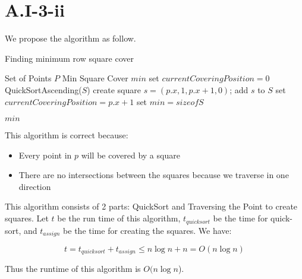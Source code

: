 \section*{A.I-3-ii}
\label{a-1-3-2}
We propose the algorithm as follow.

\begin{algorithm}
  \caption{Finding minimum row square cover}
  \label{alg:row_minimum}
  \begin{algorithmic}
    \Require Set of Points $P$
    \Ensure Min Square Cover $min$
    \renewcommand{\algorithmicrequire}{\textbf{Input:}}
    \renewcommand{\algorithmicensure}{\textbf{Output:}}
    \algnewcommand{}
    \algnewcommand\Operation{\item[\algorithmicoperation]}
    \Operation
    \State set $currentCoveringPosition = 0$
    \State QuickSortAscending($S$)
    \State create square $s = (p.x, 1, p.x + 1, 0)$;
    \State add $s$ to $S$
    \State set $currentCoveringPosition = p.x + 1$
    \EndIf
    \State set $min = size of S$

    \Return $min$
    \EndFor
  \end{algorithmic}
\end{algorithm}

This algorithm is correct because:

\begin{itemize}
    \item Every point in $p$ will be covered by a square
    \item There are no intersections between the squares because we traverse in one direction
  \end{itemize}

  This algorithm consists of 2 parts: QuickSort and Traversing the Point to create squares. Let $t$ be the run time of this algorithm, $t_{quicksort}$ be the time for quick-sort, and $t_{assign}$ be the time for creating the squares. We have:

  \begin{equation}
    t = t_{quicksort} + t_{assign} \leq n\log n + n = O(n\log n)
  \end{equation}

  Thus the runtime of this algorithm is $O(n\log n$).
